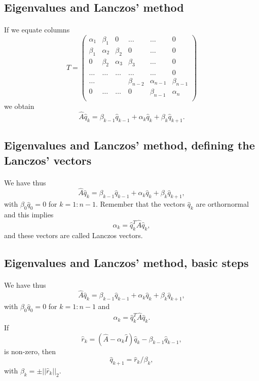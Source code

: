 \documentclass[%
oneside,                 %
final,                   %
10pt]{article}
\begin{document}
\subsection*{Eigenvalues and Lanczos' method}

\paragraph{}
If we equate columns 
\[
\hat{T} = \left(\begin{array}{cccccc}
        \alpha_1& \beta_1 & 0 &\dots   & \dots &0 \\
        \beta_1 & \alpha_2 & \beta_2 &0 &\dots &0 \\
        0& \beta_2 & \alpha_3 & \beta_3 & \dots &0 \\
        \dots& \dots   & \dots &\dots   &\dots & 0 \\
        \dots&   &  &\beta_{n-2}  &\alpha_{n-1}& \beta_{n-1} \\
        0&  \dots  &\dots  &0   &\beta_{n-1} & \alpha_{n} \\
        \end{array} \right)
\]
we obtain
\[
\hat{A}\hat{q}_k=\beta_{k-1}\hat{q}_{k-1}+\alpha_k\hat{q}_k+\beta_k\hat{q}_{k+1}.
\]



\subsection*{Eigenvalues and Lanczos' method, defining the Lanczos' vectors}

\paragraph{}
We have thus
\[
\hat{A}\hat{q}_k=\beta_{k-1}\hat{q}_{k-1}+\alpha_k\hat{q}_k+\beta_k\hat{q}_{k+1},
\]
with $\beta_0\hat{q}_0=0$ for $k=1:n-1$. Remember that the vectors $\hat{q}_k$  are orthornormal and this implies
\[
\alpha_k=\hat{q}_k^T\hat{A}\hat{q}_k,
\]
and these vectors are called Lanczos vectors.



\subsection*{Eigenvalues and Lanczos' method, basic steps}

\paragraph{}
We have thus
\[
\hat{A}\hat{q}_k=\beta_{k-1}\hat{q}_{k-1}+\alpha_k\hat{q}_k+\beta_k\hat{q}_{k+1},
\]
with $\beta_0\hat{q}_0=0$ for $k=1:n-1$ and 
\[
\alpha_k=\hat{q}_k^T\hat{A}\hat{q}_k.
\]
If 
\[
\hat{r}_k=(\hat{A}-\alpha_k\hat{I})\hat{q}_k-\beta_{k-1}\hat{q}_{k-1},
\]
is non-zero, then 
\[
\hat{q}_{k+1}=\hat{r}_{k}/\beta_k,
\]
with $\beta_k=\pm ||\hat{r}_{k}||_2$.




\end{document}
